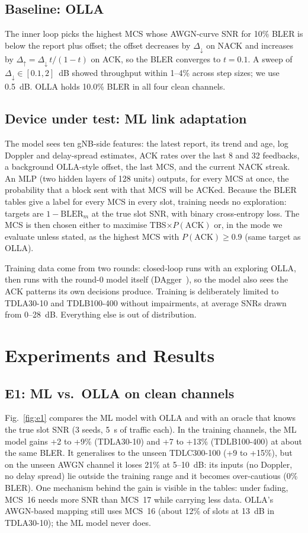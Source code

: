 \documentclass[conference]{IEEEtran}
\begin{document}
\subsection{Baseline: OLLA}
The inner loop picks the highest MCS whose AWGN-curve SNR for 10\% BLER is below the report
plus offset; the offset decreases by $\Delta_{\downarrow}$ on NACK and increases by
$\Delta_{\uparrow}=\Delta_{\downarrow}\,t/(1-t)$ on ACK, so the BLER converges to $t=0.1$. A
sweep of $\Delta_{\downarrow}\in[0.1,2]$~dB showed throughput within 1--4\% across step
sizes; we use 0.5~dB. OLLA holds 10.0\% BLER in all four clean channels.

\subsection{Device under test: ML link adaptation}
The model sees ten gNB-side features: the latest report, its trend and age, log Doppler and
delay-spread estimates, ACK rates over the last 8 and 32 feedbacks, a background OLLA-style
offset, the last MCS, and the current NACK streak. An MLP (two hidden layers of 128 units)
outputs, for every MCS at once, the probability that a block sent with that MCS will be ACKed.
Because the BLER tables give a label for every MCS in every slot, training needs no
exploration: targets are $1-\mathrm{BLER}_m$ at the true slot SNR, with binary cross-entropy
loss. The MCS is then chosen either to maximise TBS$\times P(\mathrm{ACK})$ or, in the mode we
evaluate unless stated, as the highest MCS with $P(\mathrm{ACK})\ge0.9$ (same target as OLLA).

Training data come from two rounds: closed-loop runs with an exploring OLLA, then runs with
the round-0 model itself (DAgger~\cite{dagger}), so the model also sees the ACK patterns its own
decisions produce. Training is deliberately limited to TDLA30-10 and TDLB100-400 without
impairments, at average SNRs drawn from 0--28~dB. Everything else is out of distribution.

\section{Experiments and Results}

\subsection{E1: ML vs.\ OLLA on clean channels}\label{sec:e1}
Fig.~\ref{fig:e1} compares the ML model with OLLA and with an oracle that knows the true slot
SNR (3 seeds, 5~s of traffic each). In the training channels, the ML model gains +2 to +9\%
(TDLA30-10) and +7 to +13\% (TDLB100-400) at about the same BLER. It generalises to the unseen
TDLC300-100 (+9 to +15\%), but on the unseen AWGN channel it loses 21\% at 5--10~dB: its
inputs (no Doppler, no delay spread) lie outside the training range and it becomes
over-cautious (0\% BLER). One mechanism behind the gain is visible in the tables: under fading,
MCS~16 needs more SNR than MCS~17 while carrying less data. OLLA's AWGN-based mapping still
uses MCS~16 (about 12\% of slots at 13~dB in TDLA30-10); the ML model never does.
\end{document}
